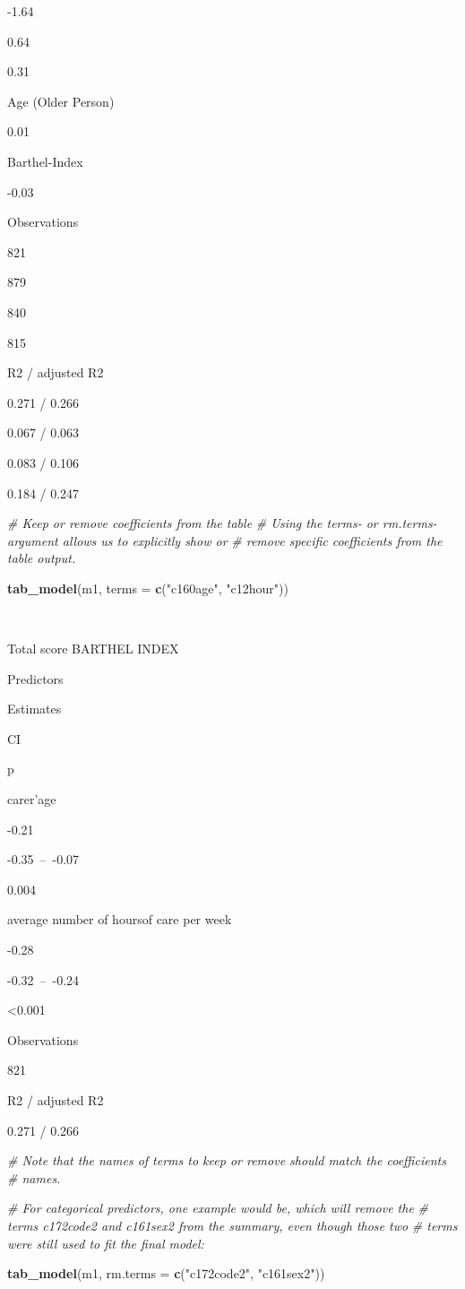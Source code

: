 \documentclass[]{article}
\newenvironment{Shaded}{\begin{snugshade}}{\end{snugshade}}
\newcommand{\KeywordTok}[1]{\textcolor[rgb]{0.13,0.29,0.53}{\textbf{#1}}}
\newcommand{\DataTypeTok}[1]{\textcolor[rgb]{0.13,0.29,0.53}{#1}}
\newcommand{\StringTok}[1]{\textcolor[rgb]{0.31,0.60,0.02}{#1}}
\newcommand{\CommentTok}[1]{\textcolor[rgb]{0.56,0.35,0.01}{\textit{#1}}}
\newcommand{\NormalTok}[1]{#1}
\begin{document}
-1.64

0.64

0.31

Age (Older Person)

0.01

Barthel-Index

-0.03

Observations

821

879

840

815

R2 / adjusted R2

0.271 / 0.266

0.067 / 0.063

0.083 / 0.106

0.184 / 0.247

\begin{Shaded}
\begin{Highlighting}[]
\CommentTok{# Keep or remove coefficients from the table}
\CommentTok{# Using the terms- or rm.terms-argument allows us to explicitly show or }
\CommentTok{# remove specific coefficients from the table output.}

\KeywordTok{tab_model}\NormalTok{(m1, }\DataTypeTok{terms =} \KeywordTok{c}\NormalTok{(}\StringTok{"c160age"}\NormalTok{, }\StringTok{"c12hour"}\NormalTok{))}
\end{Highlighting}
\end{Shaded}

~

Total score BARTHEL INDEX

Predictors

Estimates

CI

p

carer'age

-0.21

-0.35~--~-0.07

0.004

average number of hoursof care per week

-0.28

-0.32~--~-0.24

\textless{}0.001

Observations

821

R2 / adjusted R2

0.271 / 0.266

\begin{Shaded}
\begin{Highlighting}[]
\CommentTok{# Note that the names of terms to keep or remove should match the coefficients}
\CommentTok{# names. }

\CommentTok{# For categorical predictors, one example would be, which will remove the}
\CommentTok{# terms c172code2 and c161sex2 from the summary, even though those two}
\CommentTok{# terms were still used to fit the final model:}

\KeywordTok{tab_model}\NormalTok{(m1, }\DataTypeTok{rm.terms =} \KeywordTok{c}\NormalTok{(}\StringTok{"c172code2"}\NormalTok{, }\StringTok{"c161sex2"}\NormalTok{))}
\end{Highlighting}
\end{Shaded}
\end{document}
